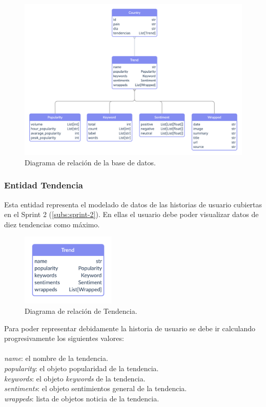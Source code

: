 \vspace{0.3cm}

\begin{figure}[H]
    \centering
    \myfloatalign
    \includegraphics[width=1\textwidth]{gfx/Models-diagram.png}
    \caption[Diagrama de relación de la base de datos]{Diagrama de relación de la base de datos.}\label{gfx:Models-diagram}
\end{figure}

\newpage

\subsubsection{Entidad Tendencia}\label{subsub:ent-tendencia}
Esta entidad representa el modelado de datos de las historias de usuario cubiertas en el Sprint 2 (\ref{subs:sprint-2}). En ellas el usuario debe poder visualizar datos de diez tendencias como máximo.
\begin{figure}[H]
    \centering
    \myfloatalign
    \includegraphics[width=0.4\textwidth]{gfx/diagrama-er0.png}
    \caption[Diagrama de relación de Tendencia]{Diagrama de relación de Tendencia.}\label{gfx:diagrama-er0}
\end{figure}
Para poder representar debidamente la historia de usuario se debe ir calculando progresivamente los siguientes valores:
\\\\
\textit{name}: el nombre de la tendencia.  \\
\textit{popularity}: el objeto popularidad de la tendencia.    \\
\textit{keywords}: el objeto \textit{keywords} de la tendencia.    \\
\textit{sentiments}: el objeto sentimientos general de la tendencia.    \\
\textit{wrappeds}: lista de objetos noticia de la tendencia.

